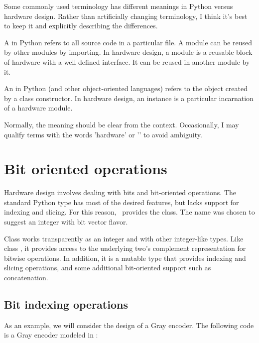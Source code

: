 \begin{notice}[warning]
Some commonly used terminology has different meanings
in Python versus hardware design. Rather than artificially
changing terminology, I think it's best to keep it
and explicitly describing the differences.

A  in Python refers to all source code
in a particular file. A module can be reused by
other modules by importing. In hardware design,
%
a module is  a reusable block of hardware with
a well defined interface. It can be reused in 
another module by  it.

An  in Python (and other object-oriented
languages) refers to the object created by a
%
class constructor. In hardware design, an instance
is a particular incarnation of a hardware module.

Normally, the meaning should be clear from
the context. Occasionally, I may qualify terms 
with the words 'hardware' or '\myhdl{}' to 
avoid ambiguity.
\end{notice}


\section{Bit oriented operations \label{intro-bit}}

Hardware design involves dealing with bits and bit-oriented
operations. The standard Python type  has most of the
desired features, but lacks support for indexing and slicing. For this
reason, \myhdl\ provides the  class. The name was chosen
to suggest an integer with bit vector flavor.

Class  works transparently as an integer and with other
integer-like types. Like class , it provides access to the
underlying two's complement representation for bitwise
operations. In addition, it is a mutable type that provides indexing
and slicing operations, and some additional bit-oriented support such
as concatenation.

\subsection{Bit indexing operations \label{intro-indexing}}

As an example, we will consider the design of a Gray encoder. The
following code is a Gray encoder modeled in \myhdl{}:

